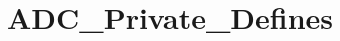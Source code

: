 \hypertarget{group___a_d_c___private___defines}{\section{A\-D\-C\-\_\-\-Private\-\_\-\-Defines}
\label{group___a_d_c___private___defines}
}

